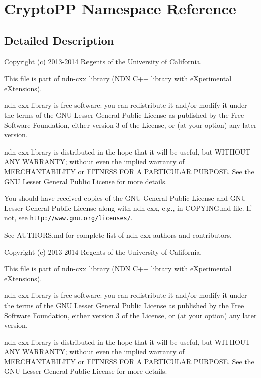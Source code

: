 \hypertarget{namespaceCryptoPP}{}\section{Crypto\+PP Namespace Reference}
\label{namespaceCryptoPP}


\subsection{Detailed Description}
Copyright (c) 2013-\/2014 Regents of the University of California.

This file is part of ndn-\/cxx library (N\+DN C++ library with e\+Xperimental e\+Xtensions).

ndn-\/cxx library is free software\+: you can redistribute it and/or modify it under the terms of the G\+NU Lesser General Public License as published by the Free Software Foundation, either version 3 of the License, or (at your option) any later version.

ndn-\/cxx library is distributed in the hope that it will be useful, but W\+I\+T\+H\+O\+UT A\+NY W\+A\+R\+R\+A\+N\+TY; without even the implied warranty of M\+E\+R\+C\+H\+A\+N\+T\+A\+B\+I\+L\+I\+TY or F\+I\+T\+N\+E\+SS F\+OR A P\+A\+R\+T\+I\+C\+U\+L\+AR P\+U\+R\+P\+O\+SE. See the G\+NU Lesser General Public License for more details.

You should have received copies of the G\+NU General Public License and G\+NU Lesser General Public License along with ndn-\/cxx, e.\+g., in C\+O\+P\+Y\+I\+N\+G.\+md file. If not, see \href{http://www.gnu.org/licenses/}{\tt http\+://www.\+gnu.\+org/licenses/}.

See A\+U\+T\+H\+O\+R\+S.\+md for complete list of ndn-\/cxx authors and contributors.

Copyright (c) 2013-\/2014 Regents of the University of California.

This file is part of ndn-\/cxx library (N\+DN C++ library with e\+Xperimental e\+Xtensions).

ndn-\/cxx library is free software\+: you can redistribute it and/or modify it under the terms of the G\+NU Lesser General Public License as published by the Free Software Foundation, either version 3 of the License, or (at your option) any later version.

ndn-\/cxx library is distributed in the hope that it will be useful, but W\+I\+T\+H\+O\+UT A\+NY W\+A\+R\+R\+A\+N\+TY; without even the implied warranty of M\+E\+R\+C\+H\+A\+N\+T\+A\+B\+I\+L\+I\+TY or F\+I\+T\+N\+E\+SS F\+OR A P\+A\+R\+T\+I\+C\+U\+L\+AR P\+U\+R\+P\+O\+SE. See the G\+NU Lesser General Public License for more details.

